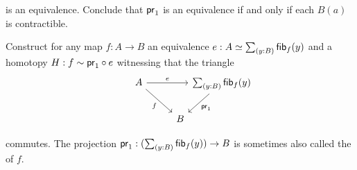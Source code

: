 \begin{exercises}
\begin{equation*}
  \end{equation*}
  is an equivalence. Conclude that $\mathsf{pr}_{1}$ is an equivalence if and only if each $B(a)$ is contractible.
\item \label{ex:fib_replacement}Construct for any map $f:A\to B$ an equivalence $e:\eqv{A}{\sm{y:B}\fib{f}{y}}$ and a homotopy $H:f\sim \mathsf{pr}_{1}\circ e$ witnessing that the triangle
  \begin{equation*}
    \begin{tikzcd}[column sep=0em]
      A \arrow[rr,"e"] \arrow[dr,swap,"f"] & & \sm{y:B}\fib{f}{y} \arrow[dl,"\proj 1"] \\
      \phantom{\sm{y:B}\fib{f}{y}} & B
    \end{tikzcd}
  \end{equation*}
  commutes. The projection $\proj 1 : (\sm{y:B}\fib{f}{y})\to B$ is sometimes also called the  of $f$.
\end{exercises}
